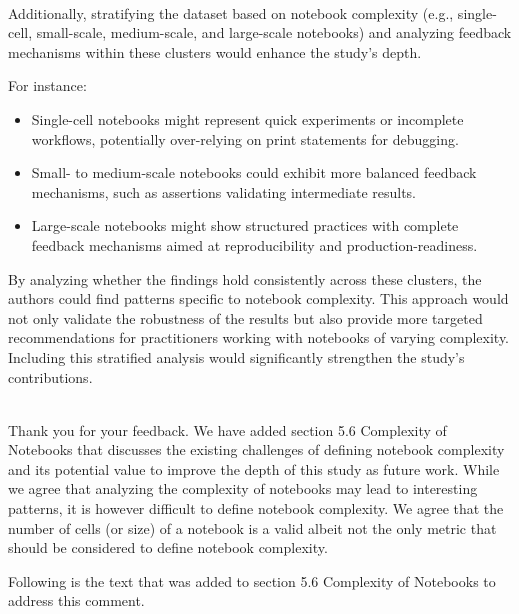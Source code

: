 \documentclass[11pt,fleqn]{article}
\newcommand{\eline}{\vspace*{.75\baselineskip}}
\newcommand{\Referee}[1]{\eline \noindent {\bf Reviewer comment #1:} \\}
\newcommand{\Us}{\eline \noindent {\bf Response:}\\}
\newenvironment{revcomment}[1][]
{\Referee{#1}\begin{rcomment}}
{\end{rcomment}}
\begin{document}
\begin{revcomment}[2.4]
  Additionally, stratifying the dataset based on notebook complexity (e.g., single-cell, small-scale, medium-scale, and large-scale notebooks) and analyzing feedback mechanisms within these clusters would enhance the study's depth.

  For instance:
  \begin{itemize}
  \item Single-cell notebooks might represent quick experiments or incomplete workflows, potentially over-relying on print statements for debugging.
  \item Small- to medium-scale notebooks could exhibit more balanced feedback mechanisms, such as assertions validating intermediate results.
  \item Large-scale notebooks might show structured practices with complete feedback mechanisms aimed at reproducibility and production-readiness.
  \end{itemize}

  By analyzing whether the findings hold consistently across these clusters, the authors could find patterns specific to notebook complexity. This approach would not only validate the robustness of the results but also provide more targeted recommendations for practitioners working with notebooks of varying complexity. Including this stratified analysis would significantly strengthen the study's contributions.
\end{revcomment}

\Us Thank you for your feedback. We have added section 5.6 Complexity of Notebooks that discusses the existing challenges of defining notebook complexity and its potential value to improve the depth of this study as future work. While we agree that analyzing the complexity of notebooks may lead to interesting patterns, it is however difficult to define notebook complexity. We agree that the number of cells (or size) of a notebook is a valid albeit not the only metric that should be considered to define notebook complexity.

Following is the text that was added to section 5.6 Complexity of Notebooks to address this comment.
\end{document}
